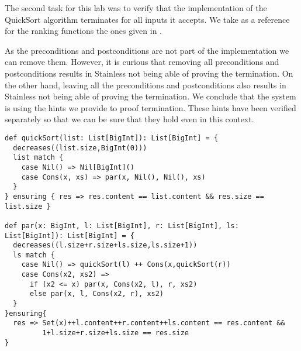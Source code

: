 \documentclass[a4paper,11pt]{article}
\theoremstyle{mytheor}
\begin{document}
The second task for this lab was to verify that the implementation of the QuickSort algorithm terminates for all inputs it accepts. We take as a reference for the ranking functions the ones given in  \cite{typearticle}. 

As the preconditions and postconditions are not part of the implementation we can remove them. However, it is curious that removing all preconditions and postconditions results in Stainless not being able of proving the termination. On the other hand, leaving all the preconditions and postconditions also results in Stainless not being able of proving the termination. We conclude that the system is using the hints we provide to proof termination. These hints have been verified separately so that we can be sure that they hold even in this context. 

\begin{lstlisting}[label={list:second},caption=Using decreases construct to proof termination]
def quickSort(list: List[BigInt]): List[BigInt] = {
  decreases((list.size,BigInt(0)))
  list match {
    case Nil() => Nil[BigInt]()
    case Cons(x, xs) => par(x, Nil(), Nil(), xs)
  }
} ensuring { res => res.content == list.content && res.size == list.size }
 
def par(x: BigInt, l: List[BigInt], r: List[BigInt], ls: List[BigInt]): List[BigInt] = {
  decreases((l.size+r.size+ls.size,ls.size+1))
  ls match {
    case Nil() => quickSort(l) ++ Cons(x,quickSort(r))
    case Cons(x2, xs2) => 
      if (x2 <= x) par(x, Cons(x2, l), r, xs2) 
      else par(x, l, Cons(x2, r), xs2)
  }
}ensuring{
  res => Set(x)++l.content++r.content++ls.content == res.content &&
         1+l.size+r.size+ls.size == res.size
}
\end{lstlisting}



\printbibliography
\end{document}
